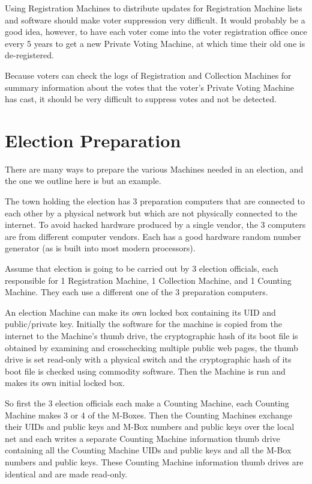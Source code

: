 \documentclass[12pt]{article}
\begin{document}
Using Registration Machines to distribute updates for Registration
Machine lists and software should make voter suppression very difficult.
It would probably be a good idea, however, to have each voter come into
the voter registration office once every 5 years to get a new
Private Voting Machine, at which time their old one is de-registered.

Because voters can check the logs of Registration and Collection Machines
for summary information about the votes that the voter's Private Voting Machine
has cast, it should be very difficult to suppress votes and not be detected.

\section{Election Preparation}

There are many ways to prepare the various Machines needed in an election,
and the one we outline here is but an example.

The town holding the election has 3 preparation computers that are
connected to each other by a physical network but which are not
physically connected to the internet.  To avoid hacked hardware
produced by a single vendor, the 3 computers are from different
computer vendors.  Each has a good hardware random number generator
(as is built into most modern processors).

Assume that election is going to be carried out by 3 election
officials, each responsible for 1 Registration Machine, 1 Collection
Machine, and 1 Counting Machine.  They each use a different one of
the 3 preparation computers.

An election Machine can make its own locked box containing its UID
and public/private key.  Initially the software for the machine
is copied from the internet to the Machine's thumb drive,
the cryptographic hash of its boot file is obtained by examining
and crosschecking multiple public web pages, the thumb
drive is set read-only with a physical switch and the cryptographic
hash of its boot file is checked using commodity software.
Then the Machine is run and makes its own initial locked box.

So first the 3 election officials each make a Counting Machine,
each Counting Machine makes 3 or 4 of the M-Boxes.  Then
the Counting Machines exchange their UIDs and public keys and M-Box
numbers and public keys over the local net
and each writes a separate Counting Machine information
thumb drive containing all the
Counting Machine UIDs and public keys and all the M-Box numbers and
public keys.  These Counting Machine information
thumb drives are identical and are made read-only.
\end{document}
